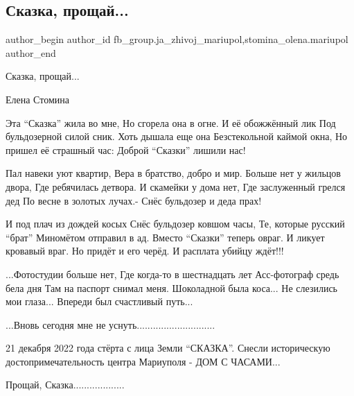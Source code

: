  
 
 
 
 

\subsection{Сказка, прощай...}
\label{sec:24_02_2023.fb.fb_group.ja_zhivoj_mariupol.2.skazka__proshchai_}
 
\ifcmt
 author_begin
   author_id fb_group.ja_zhivoj_mariupol,stomina_olena.mariupol
 author_end
\fi

Сказка, прощай...

Елена Стомина

\obeycr
Эта \enquote{Сказка} жила во мне,
Но сгорела она в огне.
И её обожжённый лик
Под бульдозерной силой сник.
Хоть дышала еще она
Безстекольной каймой окна,
Но пришел её страшный час:
Доброй \enquote{Сказки} лишили нас!
\restorecr

\obeycr
Пал навеки уют квартир,
Вера в братство, добро и мир.
Больше нет у жильцов двора,
Где ребячилась детвора.
И скамейки у дома нет,
Где заслуженный грелся дед
По весне в золотых лучах.-
Снёс бульдозер и деда прах!
\restorecr

\obeycr
И под плач из дождей косых
Снёс бульдозер ковшом часы,
Те, которые русский \enquote{брат}
Миномётом отправил в ад.
Вместо \enquote{Сказки} теперь овраг.
И ликует кровавый враг.
Но придёт и его черёд.
И расплата убийцу ждёт!!!
\restorecr

\obeycr
...Фотостудии больше нет,
Где когда-то в шестнадцать лет
Асс-фотограф средь бела дня
Там на паспорт снимал меня.
Шоколадной была коса...
Не слезились мои глаза...
Впереди был счастливый путь...
\restorecr

...Вновь сегодня мне не уснуть.............................

21 декабря 2022 года стёрта с лица Земли \enquote{СКАЗКА}. Снесли историческую
достопримечательность центра Мариуполя - ДОМ С ЧАСАМИ...

Прощай, Сказка...................
